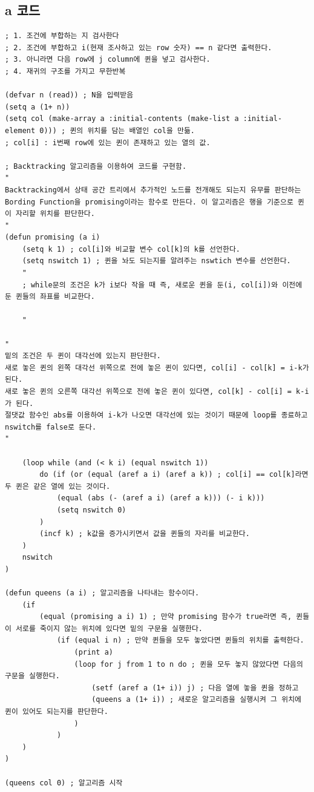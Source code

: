 \documentclass{article}
\begin{document}
\subsection{a 코드}
\begin{verbatim}
; 1. 조건에 부합하는 지 검사한다
; 2. 조건에 부합하고 i(현재 조사하고 있는 row 숫자) == n 같다면 출력한다.
; 3. 아니라면 다음 row에 j column에 퀸을 넣고 검사한다.
; 4. 재귀의 구조를 가지고 무한반복

(defvar n (read)) ; N을 입력받음
(setq a (1+ n)) 
(setq col (make-array a :initial-contents (make-list a :initial-element 0))) ; 퀸의 위치를 담는 배열인 col을 만듦.
; col[i] : i번째 row에 있는 퀸이 존재하고 있는 열의 값.

; Backtracking 알고리즘을 이용하여 코드를 구현함.
"
Backtracking에서 상태 공간 트리에서 추가적인 노드를 전개해도 되는지 유무를 판단하는 
Bording Function을 promising이라는 함수로 만든다. 이 알고리즘은 행을 기준으로 퀸이 자리할 위치를 판단한다.
"
(defun promising (a i) 
    (setq k 1) ; col[i]와 비교할 변수 col[k]의 k를 선언한다.
    (setq nswitch 1) ; 퀸을 놔도 되는지를 알려주는 nswtich 변수를 선언한다.
    "
    ; while문의 조건은 k가 i보다 작을 때 즉, 새로운 퀸을 둔(i, col[i])와 이전에 둔 퀸들의 좌표를 비교한다.
    
    "

"
밑의 조건은 두 퀸이 대각선에 있는지 판단한다. 
새로 놓은 퀸의 왼쪽 대각선 위쪽으로 전에 놓은 퀸이 있다면, col[i] - col[k] = i-k가 된다.
새로 놓은 퀸의 오른쪽 대각선 위쪽으로 전에 놓은 퀸이 있다면, col[k] - col[i] = k-i가 된다.
절댓값 함수인 abs를 이용하여 i-k가 나오면 대각선에 있는 것이기 때문에 loop를 종료하고 nswitch를 false로 둔다.
"
    
    (loop while (and (< k i) (equal nswitch 1)) 
        do (if (or (equal (aref a i) (aref a k)) ; col[i] == col[k]라면 두 퀸은 같은 열에 있는 것이다.  
            (equal (abs (- (aref a i) (aref a k))) (- i k)))         
            (setq nswitch 0)
        )
        (incf k) ; k값을 증가시키면서 값을 퀸들의 자리를 비교한다.
    )
    nswitch
)

(defun queens (a i) ; 알고리즘을 나타내는 함수이다.
    (if 
        (equal (promising a i) 1) ; 만약 promising 함수가 true라면 즉, 퀸들이 서로를 죽이지 않는 위치에 있다면 밑의 구문을 실행한다.
            (if (equal i n) ; 만약 퀸들을 모두 놓았다면 퀸들의 위치를 출력한다.
                (print a)
                (loop for j from 1 to n do ; 퀸을 모두 놓지 않았다면 다음의 구문을 실행한다.
                    (setf (aref a (1+ i)) j) ; 다음 열에 놓을 퀸을 정하고
                    (queens a (1+ i)) ; 새로운 알고리즘을 실행시켜 그 위치에 퀸이 있어도 되는지를 판단한다.
                )            
            )  
    )
)

(queens col 0) ; 알고리즘 시작  
\end{verbatim}
\newpage
\end{document}
